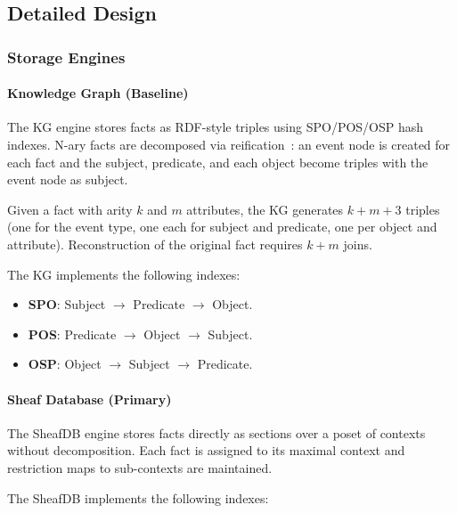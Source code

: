 
\subsection{Detailed Design}

\subsubsection{Storage Engines}

\paragraph{Knowledge Graph (Baseline)}

The KG engine stores facts as RDF-style triples using SPO/POS/OSP hash
indexes.  N-ary facts are decomposed via reification~\cite{manola2004rdf}:
an event node is created for each fact and the subject, predicate, and
each object become triples with the event node as subject.

Given a fact with arity $k$ and $m$ attributes, the KG generates
$k + m + 3$ triples (one for the event type, one each for subject and
predicate, one per object and attribute).  Reconstruction of the
original fact requires $k + m$ joins.

The KG implements the following indexes:

\begin{itemize}
    \item \textbf{SPO}: Subject $\rightarrow$ Predicate $\rightarrow$ Object.
    \item \textbf{POS}: Predicate $\rightarrow$ Object $\rightarrow$ Subject.
    \item \textbf{OSP}: Object $\rightarrow$ Subject $\rightarrow$ Predicate.
\end{itemize}

\paragraph{Sheaf Database (Primary)}

The SheafDB engine stores facts directly as sections over a poset of
contexts without decomposition.  Each fact is assigned to its maximal
context and restriction maps to sub-contexts are maintained.

The SheafDB implements the following indexes:

